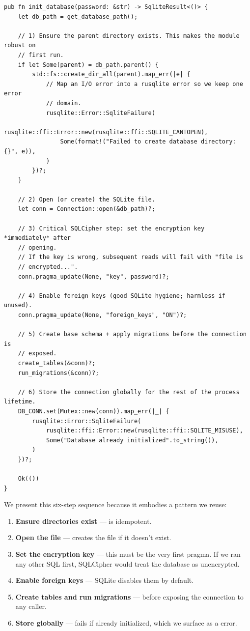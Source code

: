 \begin{listing}[H]
\caption{: establishing the encrypted connection}
\label{lst:ch20-init-db}
\begin{verbatim}
pub fn init_database(password: &str) -> SqliteResult<()> {
    let db_path = get_database_path();

    // 1) Ensure the parent directory exists. This makes the module robust on
    // first run.
    if let Some(parent) = db_path.parent() {
        std::fs::create_dir_all(parent).map_err(|e| {
            // Map an I/O error into a rusqlite error so we keep one error
            // domain.
            rusqlite::Error::SqliteFailure(
                rusqlite::ffi::Error::new(rusqlite::ffi::SQLITE_CANTOPEN),
                Some(format!("Failed to create database directory: {}", e)),
            )
        })?;
    }

    // 2) Open (or create) the SQLite file.
    let conn = Connection::open(&db_path)?;

    // 3) Critical SQLCipher step: set the encryption key *immediately* after
    // opening.
    // If the key is wrong, subsequent reads will fail with "file is
    // encrypted...".
    conn.pragma_update(None, "key", password)?;

    // 4) Enable foreign keys (good SQLite hygiene; harmless if unused).
    conn.pragma_update(None, "foreign_keys", "ON")?;

    // 5) Create base schema + apply migrations before the connection is
    // exposed.
    create_tables(&conn)?;
    run_migrations(&conn)?;

    // 6) Store the connection globally for the rest of the process lifetime.
    DB_CONN.set(Mutex::new(conn)).map_err(|_| {
        rusqlite::Error::SqliteFailure(
            rusqlite::ffi::Error::new(rusqlite::ffi::SQLITE_MISUSE),
            Some("Database already initialized".to_string()),
        )
    })?;

    Ok(())
}
\end{verbatim}
\end{listing}

We present this six-step sequence because it embodies a pattern we reuse:

\begin{enumerate}
  \item \textbf{Ensure directories exist} ---  is idempotent.
  \item \textbf{Open the file} ---  creates the file if it doesn't exist.
  \item \textbf{Set the encryption key} --- this must be the very first pragma. If we ran any other SQL first, SQLCipher would treat the database as unencrypted.
  \item \textbf{Enable foreign keys} --- SQLite disables them by default.
  \item \textbf{Create tables and run migrations} --- before exposing the connection to any caller.
  \item \textbf{Store globally} ---  fails if already initialized, which we surface as a  error.
\end{enumerate}

